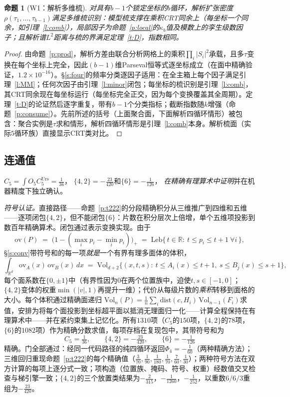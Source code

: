 \documentclass[11pt]{article}
\numberwithin{equation}{section}
\newtheorem{proposition}[theorem]{命题}
\theoremstyle{definition}
\theoremstyle{remark}
\begin{document}
\begin{proposition}[W1：解析多维梳]\label{p:W1}
对具有$b-1$个锁定坐标的$b$循环，解析扩张密度
$\rho(\tau_1,\dots,\tau_{b-1})$满足多维梳识别：模型梳支撑在乘积CRT同余上（每坐标一个同余，如引理~\ref{l:comb}），局部因子为命题~\ref{p:local}的$\kappa_b$值及模数上的孪生级数因子；且解析谱$L^2$距离与梳的界满足定理~\ref{t:D}，指数相同。
\end{proposition}

\begin{proof}
由命题~\ref{p:prod}，解析方差由联合分析网格上的乘积$\prod_i|S_i|^2$承载，且多$\tau$变换在每个坐标上完全，因此$(b-1)$维Parseval恒等式逐坐标成立（在面中精确验证，$1.2\times10^{-16}$）。\S\ref{s:four}的频率分类逐因子适用：在全主箱上每个因子满足引理~\ref{l:MM}；任何次因子由引理~\ref{l:minor}闭包；每坐标的梳识别是引理~\ref{l:comb}，其CRT同余现在每坐标运行（每坐标完全正交，因为每个变换覆盖其全周期）。定理~\ref{t:D}的论证然后逐字重复，带有$b-1$个分类指标；截断指数随$k$增强（命题~\ref{p:consume}）。先前所述的括号（上面聚合面，下面解析四循环情形）被包含：聚合实例是$\tau$求和情形，解析四循环情形是引理~\ref{l:comb}本身。解析梳面（实际$5$循环族）直接显示CRT类对比。
\end{proof}

\subsection{连通值}\label{s:five:conn}

$C_5=\int O_5C_5^{\mathrm{Urs}}=\tfrac1{36}$，
$\{4,2\}=-\tfrac{23}{420}$和$\{6\}=-\tfrac1{126}$，
\emph{在精确有理算术中证明}并在机器精度下独立确认。

\emph{符号认证。}直接路径——命题~\ref{p:t222}的分段精确积分从三维推广到四维和五维——逐项闭包$\{4,2\}$，但不能闭包$\{6\}$：片数在积分层次上倍增，单个五维项投影到数百年精确算术。闭包通过表示变换实现。由于
\[
\mathrm{ov}(P)\;=\;\bigl(1-(\max_i p_i-\min_i p_i)\bigr)_+
\;=\;\mathrm{Leb}\{\,t\in\mathbb R:\ t\le p_i\le t+1\ \forall
i\,\},
\]
\S\ref{s:conv}带符号和的每一项\emph{就是}一个有界有理多面体的体积，
\[
\int_{\mathbb R^d}\mathrm{ov}_A(x)\,\mathrm{ov}_B(x)\,dx
\;=\;\mathrm{Vol}_{d+2}\bigl\{(x,t,s):\ t\le A_i(x)\le t+1,\
s\le B_j(x)\le s+1\bigr\},
\]
每个面系数在$\{0,\pm1\}$中（有界性因为0在两个位置族中，迫使$t,s\in[-1,0]$；$\{4,2\}$变体的权重$\min(|v|,1)$再提升一维）；代价从每级片数的\emph{乘积}转移到面格的大小。每个体积通过精确面递归
$\mathrm{Vol}_n(P)=\tfrac1n\sum_i\mathrm{dist}(c,H_i)\,
\mathrm{Vol}_{n-1}(F_i)$求值，安排为将每个面投影到坐标超平面以抵消无理面归一化——计算全程保持在有理算术中——并在紧约束集上记忆化。所有$1310$项（$C_5$的$150$项，$\{4,2\}$的$78$项，$\{6\}$的$1082$项）作为精确分数求值，每项存档在复现包中，其带符号和为
\[
C_5=\tfrac1{36},\qquad \{4,2\}=-\tfrac{23}{420},\qquad
\{6\}=-\tfrac1{126}
\]
精确。门全部通过：经同一代码路径的纯四循环返回$\Phi_4=-\tfrac1{60}$（两种精确方法）；三维回归重现命题~\ref{p:t222}的每个精确值（$\tfrac3{70},\tfrac1{90},\tfrac1{180},\tfrac1{70}, \tfrac7{60},\tfrac1{30}$）；两种符号方法在双方计算的每项上逐分式一致；项构造（位置族、掩码、符号、权重）经数值交叉检查与梯引擎一致；$\{4,2\}$的三个放置类结果为$-\tfrac2{315}$，$-\tfrac1{1260}$，$-\tfrac1{252}$，以重数$6/6/3$重组为$-\tfrac{23}{420}$。
\end{document}
